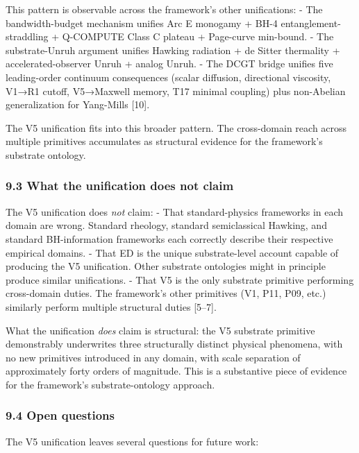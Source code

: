 \documentclass[
  11pt,
  a4paperpaper,
]{article}
\begin{document}
This pattern is observable across the framework's other unifications: -
The bandwidth-budget mechanism unifies Arc E monogamy + BH-4
entanglement-straddling + Q-COMPUTE Class C plateau + Page-curve
min-bound. - The substrate-Unruh argument unifies Hawking radiation + de
Sitter thermality + accelerated-observer Unruh + analog Unruh. - The
DCGT bridge unifies five leading-order continuum consequences (scalar
diffusion, directional viscosity, V1→R1 cutoff, V5→Maxwell memory, T17
minimal coupling) plus non-Abelian generalization for Yang-Mills
{[}10{]}.

The V5 unification fits into this broader pattern. The cross-domain
reach across multiple primitives accumulates as structural evidence for
the framework's substrate ontology.

\subsubsection{9.3 What the unification does not
claim}\label{what-the-unification-does-not-claim}

The V5 unification does \emph{not} claim: - That standard-physics
frameworks in each domain are wrong. Standard rheology, standard
semiclassical Hawking, and standard BH-information frameworks each
correctly describe their respective empirical domains. - That ED is the
unique substrate-level account capable of producing the V5 unification.
Other substrate ontologies might in principle produce similar
unifications. - That V5 is the only substrate primitive performing
cross-domain duties. The framework's other primitives (V1, P11, P09,
etc.) similarly perform multiple structural duties {[}5--7{]}.

What the unification \emph{does} claim is structural: the V5 substrate
primitive demonstrably underwrites three structurally distinct physical
phenomena, with no new primitives introduced in any domain, with scale
separation of approximately forty orders of magnitude. This is a
substantive piece of evidence for the framework's substrate-ontology
approach.

\subsubsection{9.4 Open questions}\label{open-questions}

The V5 unification leaves several questions for future work:
\end{document}
